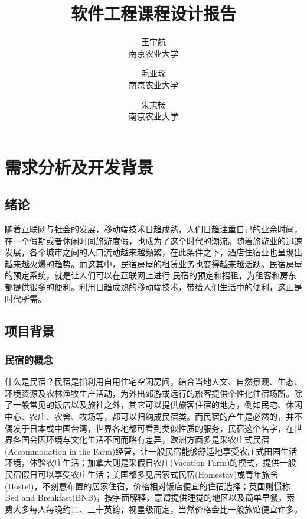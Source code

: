 \documentclass[lang=cn,11pt,a4paper,cite=authoryear]{elegantpaper}
\title{软件工程课程设计报告}
\author{王宇航 \\ 南京农业大学 \and 毛亚琛 \\ 南京农业大学 \and 朱志畅 \\ 南京农业大学}
\date{\zhtoday}
\begin{document}


\tableofcontents
\listoffigures

\maketitle

\section{需求分析及开发背景}

\subsection{绪论}

随着互联网与社会的发展，移动端技术日趋成熟，人们日趋注重自己的业余时间，在一个假期或者休闲时间旅游度假，也成为了这个时代的潮流。随着旅游业的迅速发展，各个城市之间的人口流动越来越频繁，在此条件之下，酒店住宿业也呈现出越来越火爆的趋势。而这其中，民宿房屋的租赁业务也变得越来越活跃。民宿房屋的预定系统，就是让人们可以在互联网上进行.民宿的预定和招租，为租客和房东都提供很多的便利。利用日趋成熟的移动端技术，带给人们生活中的便利，这正是时代所需。

\subsection{项目背景}

\subsubsection{民宿的概念}

什么是民宿？民宿是指利用自用住宅空闲房间，结合当地人文、自然景观、生态、环境资源及农林渔牧生产活动，为外出郊游或远行的旅客提供个性化住宿场所。除了一般常见的饭店以及旅社之外，其它可以提供旅客住宿的地方，例如民宅、休闲中心、农庄、农舍、牧场等，都可以归纳成民宿类。而民宿的产生是必然的，并不偶发于日本或中国台湾，世界各地都可看到类似性质的服务，民宿这个名字，在世界各国会因环境与文化生活不同而略有差异，欧洲方面多是采农庄式民宿(Accommodation in the Farm)经营，让一般民宿能够舒适地享受农庄式田园生活环境，体验农庄生活；加拿大则是采假日农庄(Vacation Farm)的模式，提供一般民宿假日可以享受农庄生活；美国都多见居家式民宿(Homestay)或青年旅舍(Hostel)，不刻意布置的居家住宿，价格相对饭店便宜的住宿选择；英国则惯称Bed and Breakfast(BNB)，按字面解释，意谓提供睡觉的地区以及简单早餐，索费大多每人每晚约二、三十英镑，视星级而定，当然价格会比一般旅馆便宜许多。
\end{document}
